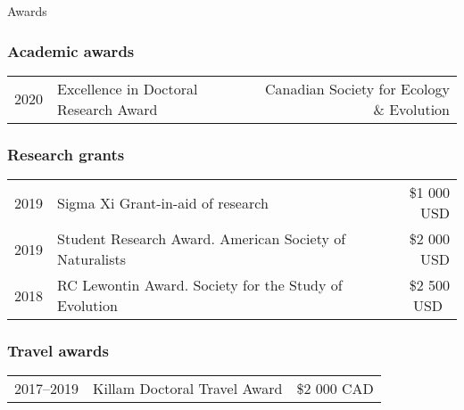 \documentclass[11pt]{article}
\begin{document}
\begin{rSection}{Awards}
\subsubsection*{Academic awards}
\begin{tabular}{llr}

2020 & Excellence in Doctoral Research Award & Canadian Society for Ecology \& Evolution\\

\end{tabular}


\subsubsection*{Research grants}
\begin{tabular}{llr}

2019 & Sigma Xi Grant-in-aid of research & \$1 000 USD\\
2019 & Student Research Award. American Society of Naturalists & \$2 000 USD\\
2018 & RC Lewontin Award. Society for the Study of Evolution & \$2 500 USD\

\end{tabular}

\subsubsection*{Travel awards}
\begin{tabular}{llr}
2017--2019 & Killam Doctoral Travel Award  & \$2 000 CAD\\ %
\end{tabular}


\end{rSection}

\vspace{0.5em}
\end{document}
